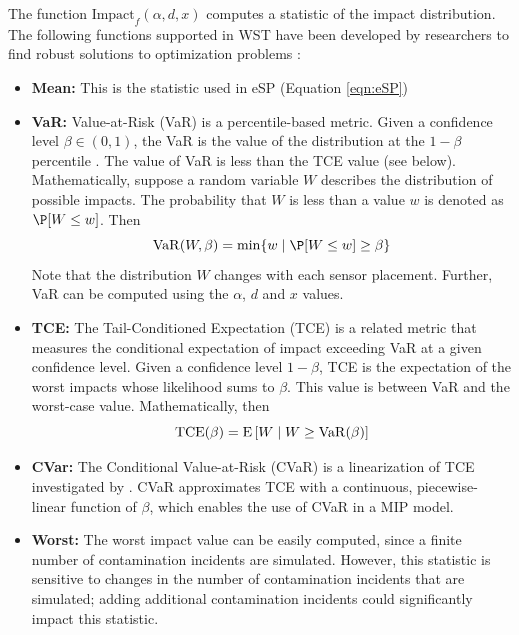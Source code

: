 The function $\textrm{Impact}_ {f}(\alpha,d,x)$ computes a statistic of the impact 
distribution. The following functions supported in WST have been developed by 
researchers to find robust solutions to optimization problems \citep{WatHarMur06a, WatMurHar09}:
\begin{itemize}
\item {\bfseries Mean:} This is the statistic used in eSP (Equation \ref{eqn:eSP})
\item {\bfseries VaR:} Value-\/at-\/Risk (VaR) is a percentile-\/based metric. 
Given a confidence level $\beta\in(0,1)$, the VaR is the value of the distribution 
at the $1-\beta$ percentile \citep{TopVlaZen02}. The value of VaR is less than 
the TCE value (see below).
Mathematically, suppose a random variable $W$ describes the distribution of possible 
impacts. The probability that $W$ is less than a value $w$ is denoted as $\P[W \le w]$. Then 
\begin{equation}
{\rm VaR}(W,\beta) = \min \{ w \mid \P[W \le w] \ge \beta \} 
\end{equation}
Note that the distribution $W$ changes with each sensor placement. Further, VaR 
can be computed using the $\alpha$, $d$ and $x$ values.
\item {\bfseries TCE:} The Tail-\/Conditioned Expectation (TCE) is a related 
metric that measures the conditional expectation of impact exceeding VaR at a 
given confidence level. Given a confidence level $1-\beta$, TCE is the expectation 
of the worst impacts whose likelihood sums to $\beta$. This value is between VaR and 
the worst-\/case value.
Mathematically, then
\begin{equation}
{\rm TCE}(\beta) = {\rm E}\left[ W \mid W \ge {\rm VaR}(\beta) \right]
\end{equation}
\item {\bfseries CVar:} The Conditional Value-\/at-\/Risk (CVaR) is a 
linearization of TCE investigated by \citet{rockafellar02cvar}. CVaR 
approximates TCE with a continuous, piecewise-\/linear function of $\beta$, 
which enables the use of CVaR in a MIP model.
\item {\bfseries Worst:} The worst impact value can be easily computed, since a 
finite number of contamination incidents are simulated. However, this statistic 
is sensitive to changes in the number of contamination incidents that are simulated; 
adding additional contamination incidents could significantly impact this statistic.
\end{itemize}

